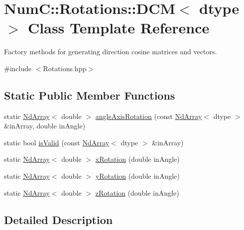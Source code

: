 \hypertarget{class_num_c_1_1_rotations_1_1_d_c_m}{}\section{NumC\+:\+:Rotations\+:\+:D\+CM$<$ dtype $>$ Class Template Reference}
\label{class_num_c_1_1_rotations_1_1_d_c_m}


Factory methods for generating direction cosine matrices and vectors.  




{\ttfamily \#include $<$Rotations.\+hpp$>$}

\subsection*{Static Public Member Functions}
\begin{DoxyCompactItemize}
\item 
static \mbox{\hyperlink{class_num_c_1_1_nd_array}{Nd\+Array}}$<$ double $>$ \mbox{\hyperlink{class_num_c_1_1_rotations_1_1_d_c_m_aa5736c3ede04e8efa2bd3bb84ded577e}{angle\+Axis\+Rotation}} (const \mbox{\hyperlink{class_num_c_1_1_nd_array}{Nd\+Array}}$<$ dtype $>$ \&in\+Array, double in\+Angle)
\item 
static bool \mbox{\hyperlink{class_num_c_1_1_rotations_1_1_d_c_m_a2c328ea5549a2a222d8bd3e320caa40a}{is\+Valid}} (const \mbox{\hyperlink{class_num_c_1_1_nd_array}{Nd\+Array}}$<$ dtype $>$ \&in\+Array)
\item 
static \mbox{\hyperlink{class_num_c_1_1_nd_array}{Nd\+Array}}$<$ double $>$ \mbox{\hyperlink{class_num_c_1_1_rotations_1_1_d_c_m_a27ccd9d9cd240719db8591411c83483f}{x\+Rotation}} (double in\+Angle)
\item 
static \mbox{\hyperlink{class_num_c_1_1_nd_array}{Nd\+Array}}$<$ double $>$ \mbox{\hyperlink{class_num_c_1_1_rotations_1_1_d_c_m_a203f020afda83b949ed4245219e17c0c}{y\+Rotation}} (double in\+Angle)
\item 
static \mbox{\hyperlink{class_num_c_1_1_nd_array}{Nd\+Array}}$<$ double $>$ \mbox{\hyperlink{class_num_c_1_1_rotations_1_1_d_c_m_a7ea7bf90a5322aa29246431b15e4b1ad}{z\+Rotation}} (double in\+Angle)
\end{DoxyCompactItemize}


\subsection{Detailed Description}
